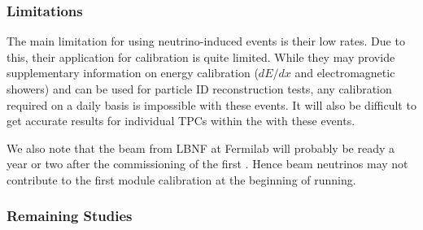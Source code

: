 

\subsubsection{Limitations}

The main limitation for using neutrino-induced events is their low rates. Due to this, their application for calibration is quite limited. While they may provide supplementary information on energy calibration ($dE/dx$ and electromagnetic showers) and can be used for particle ID reconstruction tests, any calibration required on a daily basis is impossible with these events. It will also be difficult to get accurate results for individual TPCs within the  with these events. 

We also note that the beam from LBNF at Fermilab will probably be ready a year or two after the commissioning of the first \detmodule. Hence beam neutrinos may not contribute to the first module calibration at the beginning of running.


\subsubsection{Remaining Studies}


